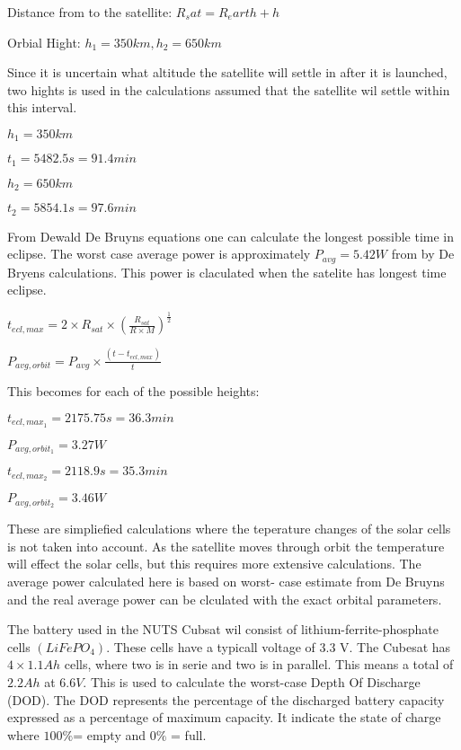 Distance from to the satellite: $R_sat = R_earth + h$

Orbial Hight: $h_1 = 350km, h_2=650km $

\vspace{5 mm}Since it is uncertain what altitude the satellite will settle in after it is launched, two hights is used in the calculations assumed that the satellite wil settle within this interval.

\vspace{5 mm}$h_1 = 350km$

$t_1 = 5482.5 s = 91.4 min$

\vspace{5 mm}$h_2 = 650km$

$t_2 = 5854.1 s = 97.6 min$

\vspace{5 mm}From Dewald De Bruyns equations one can calculate the longest possible time in eclipse. The worst case average power is approximately $P_{avg} = 5.42 W$ from by De Bryens calculations. This power is claculated when the satelite has longest time eclipse.

\vspace{5 mm}$t_{ecl,max} = 2\times R_{sat}\times(\frac{R_{sat}}{R\times M})^{\frac{1}{2}}$

$P_{avg,orbit} = P_{avg}\times\frac{(t-t_{ecl,max})}{t}$

\vspace{5 mm}This becomes for each of the possible heights:

\vspace{5 mm}$t_{ecl,max_1} = 2175.75 s = 36.3 min$

$P_{avg,orbit_1} = 3.27W$

\vspace{5 mm}$t_{ecl,max_2} = 2118.9 s = 35.3 min$

$P_{avg,orbit_2} = 3.46W$

\vspace{5 mm}These are simpliefied calculations where the teperature changes of the solar cells is not taken into account. As the satellite moves through orbit the temperature will effect the solar cells, but this requires more extensive calculations. The average power calculated here is based on worst- case estimate from De Bruyns and the real average power can be clculated with the exact orbital parameters. 

The battery used in the NUTS Cubsat wil consist of lithium-ferrite-phosphate cells $(LiFePO_4)$. 
These cells have a typicall voltage of 3.3 V. The Cubesat has $4\times 1.1 Ah$ cells, where two is in serie and two is in parallel. This means a total of $2.2Ah$ at $6.6V$. This is used to calculate the worst-case Depth Of Discharge (DOD). The DOD represents the percentage of the discharged battery capacity expressed as a percentage of maximum capacity. It indicate the state of charge where $100\% $= empty and  $0\%$ = full.

